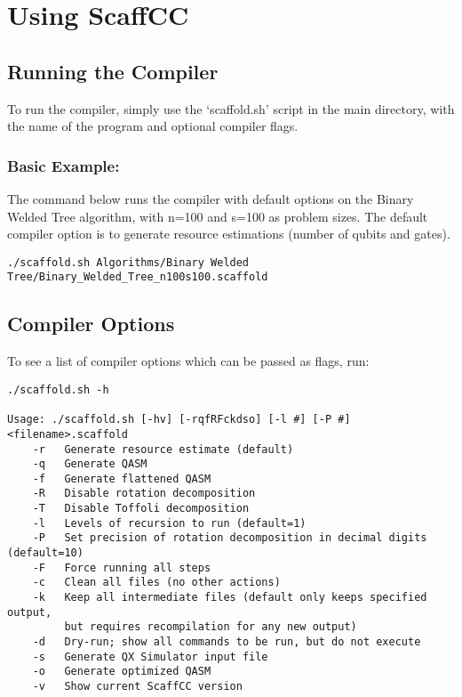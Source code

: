 \chapter{Using ScaffCC}\label{ch:usage}

\section{Running the Compiler}
To run the compiler, simply use the `scaffold.sh' script in the main directory, with the name of the program and optional compiler flags.

\subsection{Basic Example:}

The command below runs the compiler with default options on the Binary Welded Tree algorithm, with n=100 and s=100 as problem sizes.
The default compiler option is to generate resource estimations (number of qubits and gates).

\begin{lstlisting}
./scaffold.sh Algorithms/Binary Welded Tree/Binary_Welded_Tree_n100s100.scaffold
\end{lstlisting}


\section{Compiler Options}
To see a list of compiler options which can be passed as flags, run:

\begin{lstlisting}
./scaffold.sh -h

Usage: ./scaffold.sh [-hv] [-rqfRFckdso] [-l #] [-P #] <filename>.scaffold
    -r   Generate resource estimate (default)
    -q   Generate QASM
    -f   Generate flattened QASM
    -R   Disable rotation decomposition
    -T   Disable Toffoli decomposition
    -l   Levels of recursion to run (default=1)
    -P   Set precision of rotation decomposition in decimal digits (default=10)
    -F   Force running all steps
    -c   Clean all files (no other actions)
    -k   Keep all intermediate files (default only keeps specified output,
         but requires recompilation for any new output)
    -d   Dry-run; show all commands to be run, but do not execute
    -s   Generate QX Simulator input file 
    -o   Generate optimized QASM
    -v   Show current ScaffCC version
\end{lstlisting}



